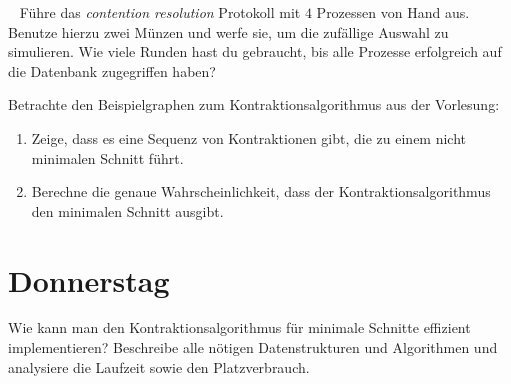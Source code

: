 \documentclass{uebung_cs}
\begin{document}
\begin{aufgabe}\
	Führe das \textit{contention resolution} Protokoll mit $4$ Prozessen von Hand aus. Benutze hierzu zwei Münzen und werfe sie, um die zufällige Auswahl zu simulieren. Wie viele Runden hast du gebraucht, bis alle Prozesse erfolgreich auf die Datenbank zugegriffen haben?
\end{aufgabe}    

\begin{aufgabe}[Minimaler Schnitt]
	Betrachte den Beispielgraphen zum Kontraktionsalgorithmus aus der Vorlesung:
	\begin{center}
	\end{center}
	\begin{enumerate}
		\item Zeige, dass es eine Sequenz von Kontraktionen gibt, die zu einem nicht minimalen Schnitt führt.
		\item Berechne die genaue Wahrscheinlichkeit, dass der Kontraktionsalgorithmus den minimalen Schnitt ausgibt.
	\end{enumerate}
\end{aufgabe}

\section*{Donnerstag}

\begin{aufgabe}
	Wie kann man den Kontraktionsalgorithmus für minimale Schnitte effizient implementieren? Beschreibe alle nötigen Datenstrukturen und Algorithmen und analysiere die Laufzeit sowie den Platzverbrauch.
\end{aufgabe}
\end{document}
